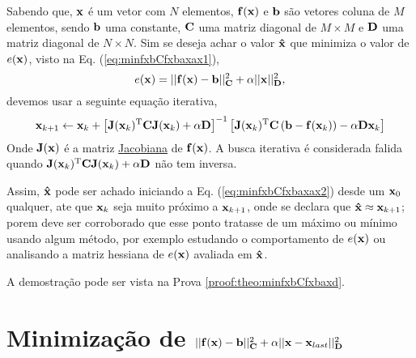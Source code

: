 \begin{theorem}\label{theo:minfxbCfxbaxax}
Sabendo que, $\VECTOR{x}$ é um vetor com $N$ elementos, $\VECTOR{f}(\VECTOR{x})$ e 
$\VECTOR{b}$ são vetores coluna de $M$ elementos, sendo $\VECTOR{b}$ uma constante,
$\MATRIX{C}$ uma matriz diagonal de $M \times M$ e 
$\MATRIX{D}$ uma matriz diagonal de $N \times N$.
Sim se deseja achar o valor $\VECTOR{\hat{x}}$ que minimiza o valor de $e(\VECTOR{x})$, visto na Eq. (\ref{eq:minfxbCfxbaxax1}),
\begin{equation}\label{eq:minfxbCfxbaxax1}
e(\VECTOR{x})=||\VECTOR{f}(\VECTOR{x})-\VECTOR{b}||_{\MATRIX{C}}^2+\alpha||\VECTOR{x}||_{\MATRIX{D}}^2,
\end{equation}
devemos usar a seguinte equação iterativa,
\begin{equation}\label{eq:minfxbCfxbaxax2}
\VECTOR{x}_{k+1}\leftarrow \VECTOR{x}_k+
\left[ \MATRIX{J}(\VECTOR{x}_k)^{\transpose}\MATRIX{C} \MATRIX{J}(\VECTOR{x}_k) +\alpha\MATRIX{D} \right]^{-1}
 \left[\MATRIX{J}(\VECTOR{x}_k)^{\transpose}\MATRIX{C}\left(\VECTOR{b}-\VECTOR{f}(\VECTOR{x}_k)\right)-\alpha\MATRIX{D}\VECTOR{x}_k\right]
\end{equation}
Onde  $\MATRIX{J}(\VECTOR{x})$ é a matriz \hyperref[def:jacobian]{Jacobiana} \cite{Jacobian} de $\VECTOR{f}(\VECTOR{x})$.
A busca iterativa é considerada falida quando 
$\MATRIX{J}(\VECTOR{x}_k)^{\transpose}\MATRIX{C} \MATRIX{J}(\VECTOR{x}_k) +\alpha\MATRIX{D}$
não tem inversa.


Assim, $\VECTOR{\hat{x}}$ pode ser achado iniciando a Eq. (\ref{eq:minfxbCfxbaxax2}) desde um $\VECTOR{x}_{0}$ qualquer, ate que $\VECTOR{x}_{k}$ seja muito próximo a $\VECTOR{x}_{k+1}$,
onde se declara que $\VECTOR{\hat{x}} \approx \VECTOR{x}_{k+1}$; porem deve ser corroborado
que esse ponto tratasse de um máximo ou mínimo usando algum método, por exemplo estudando o comportamento 
de $e(\VECTOR{x})$ ou analisando a matriz hessiana de $e(\VECTOR{x})$ avaliada em $\VECTOR{\hat{x}}$.

A demostração pode ser vista na Prova \ref{proof:theo:minfxbCfxbaxd}.
\end{theorem} 



\section{Minimização de $||\VECTOR{f}(\VECTOR{x})-\VECTOR{b}||_{\MATRIX{C}}^2+\alpha||\VECTOR{x}-\VECTOR{x}_{last}||_{\MATRIX{D}}^2$  
}

